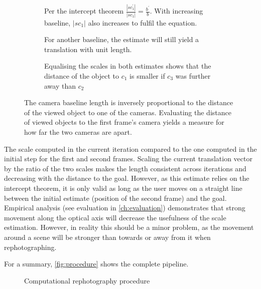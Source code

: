 \begin{figure}
   {\centering      
      \begin{subfigure}{\linewidth}
         
         \caption{Per the intercept theorem $\frac{|s c_1^\prime|}{|s c_1|} = \frac{b^\prime}{b}$.  
         With increasing baseline, $|s c_1|$ also increases to fulfil the equation.}
      \end{subfigure}

      \begin{subfigure}{\linewidth}
         
         \caption{For another baseline, the estimate will still yield a translation
         with unit length.}
      \end{subfigure}

      \begin{subfigure}{\linewidth}
         
         \caption{Equalising the scales in both estimates shows that the distance
         of the object to $c_1$ is smaller if $c_3$ was further away than $c_2$}
      \end{subfigure}

      \caption[Relation between object distance and camera baseline]{The camera
         baseline length is inversely proportional to the distance of the viewed
         object to one of the cameras. Evaluating the distance of viewed objects to
         the first frame's camera yields a measure for how far the two cameras are
      apart.}
   \label{fig:scale}}
\end{figure}


The scale computed in the current iteration compared to the one computed in the
initial step for the first and second frames. Scaling the current translation
vector by the ratio of the two scales makes the length consistent across
iterations and decreasing with the distance to the goal. However, as this
estimate relies on the intercept theorem, it is only valid as long as the user
moves on a straight line between the initial estimate (position of the second
frame) and the goal. Empirical analysis (see evaluation in
\autoref{ch:evaluation}) demonstrates that strong movement along the optical
axis will decrease the usefulness of the scale estimation. However, in reality
this should be a minor problem, as the movement around a scene will be stronger
than towards or away from it when rephotographing.

For a summary, \autoref{fig:procedure} shows the complete pipeline.
\begin{figure}[h]
   {\centering      
      
      \caption{Computational rephotography procedure}
   \label{fig:procedure}}
\end{figure}
